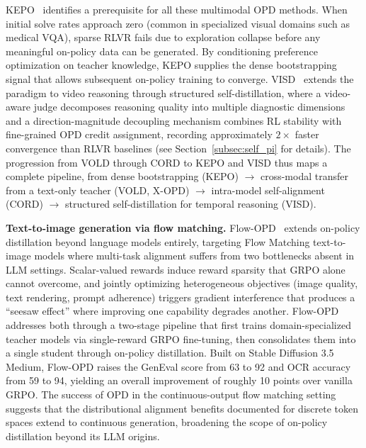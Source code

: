 \documentclass{article} %
\begin{document}
KEPO~\citep{2602.00400} identifies a prerequisite for all these multimodal OPD methods. When initial solve rates approach zero (common in specialized visual domains such as medical VQA), sparse RLVR fails due to exploration collapse before any meaningful on-policy data can be generated. By conditioning preference optimization on teacher knowledge, KEPO supplies the dense bootstrapping signal that allows subsequent on-policy training to converge. VISD~\citep{lin2026visd} extends the paradigm to video reasoning through structured self-distillation, where a video-aware judge decomposes reasoning quality into multiple diagnostic dimensions and a direction-magnitude decoupling mechanism combines RL stability with fine-grained OPD credit assignment, recording approximately $2\times$ faster convergence than RLVR baselines (see Section~\ref{subsec:self_pi} for details). The progression from VOLD through CORD to KEPO and VISD thus maps a complete pipeline, from dense bootstrapping (KEPO) $\to$ cross-modal transfer from a text-only teacher (VOLD, X-OPD) $\to$ intra-model self-alignment (CORD) $\to$ structured self-distillation for temporal reasoning (VISD).

\textbf{Text-to-image generation via flow matching.} Flow-OPD~\citep{fang2026flowopd} extends on-policy distillation beyond language models entirely, targeting Flow Matching text-to-image models where multi-task alignment suffers from two bottlenecks absent in LLM settings. Scalar-valued rewards induce reward sparsity that GRPO alone cannot overcome, and jointly optimizing heterogeneous objectives (image quality, text rendering, prompt adherence) triggers gradient interference that produces a ``seesaw effect'' where improving one capability degrades another. Flow-OPD addresses both through a two-stage pipeline that first trains domain-specialized teacher models via single-reward GRPO fine-tuning, then consolidates them into a single student through on-policy distillation. Built on Stable Diffusion 3.5 Medium, Flow-OPD raises the GenEval score from 63 to 92 and OCR accuracy from 59 to 94, yielding an overall improvement of roughly 10 points over vanilla GRPO. The success of OPD in the continuous-output flow matching setting suggests that the distributional alignment benefits documented for discrete token spaces extend to continuous generation, broadening the scope of on-policy distillation beyond its LLM origins.
\end{document}
